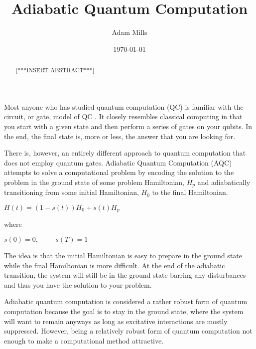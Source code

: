 \documentclass[%
 reprint,
 amsmath,amssymb,
 aps,
]{revtex4-1}
\begin{document}

\title{Adiabatic Quantum Computation}%

\author{Adam Mills}

\date{\today}%

\begin{abstract}
[***INSERT ABSTRACT***]
\end{abstract}

\maketitle



   Most anyone who has studied quantum computation (QC) is familiar with the circuit, or gate, model of QC \cite{Deutsch73}. It closely resembles classical computing in that you start with a given state and then perform a series of gates on your qubits. In the end, the final state is, more or less, the answer that you are looking for. 

   There is, however, an entirely different approach to quantum computation that does not employ quantum gates. Adiabatic Quantum Computation (AQC) attempts to solve a computational problem by encoding the solution to the problem in the ground state of some problem Hamiltonian, $H_p$ and adiabatically transitioning from some initial Hamiltonian, $H_0$ to the final Hamiltonian\cite{RevModPhys.90.015002}. 
	\begin{center}
		$H(t) = (1-s(t))H_0 + s(t)H_p $
	\end{center}
where 
	\begin{center}
		$s(0) = 0, \hspace{1cm} s(T) = 1$
	\end{center}
	   
   The idea is that the initial Hamiltonian is easy to prepare in the ground state while the final Hamiltonian is more difficult. At the end of the adiabatic transition, the system will still be in the ground state barring any disturbances and thus you have the solution to your problem.
   
   Adiabatic quantum computation is considered a rather robust form of quantum computation because the goal is to stay in the ground state, where the system will want to remain anyways as long as excitative interactions are mostly suppressed. However, being a relatively robust form of quantum computation not enough to make a computational method attractive. 
   
\end{document}
